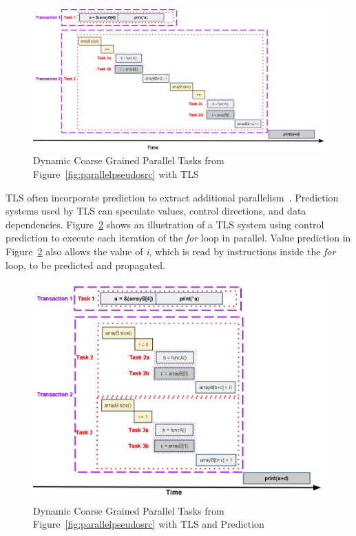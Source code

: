 \documentclass[defaultstyle,11pt]{thesis}
\begin{document}
\begin{figure}
\begin{center}
\includegraphics[width=5in]{images/ParallelTasksCoarseTLS}
\end{center}
\caption{Dynamic Coarse Grained Parallel Tasks from Figure~\ref{fig:parallelpseudosrc} with TLS}
\label{fig:parallelpseudocoarsetls}
\end{figure}

TLS often incorporate prediction to extract additional
parallelism~\cite{kejariwal:2007:tap}.  Prediction systems used by TLS
can speculate values, control directions, and data dependencies.
Figure~\ref{fig:parallelpseudocoarsepredtls} shows an illustration of
a TLS system using control prediction to execute each iteration of the
\textit{for} loop in parallel.  Value prediction in
Figure~\ref{fig:parallelpseudocoarsepredtls} also allows the value of
\textit{i}, which is read by instructions inside the \textit{for}
loop, to be predicted and propagated.

\begin{figure}
\begin{center}
\includegraphics[width=5in]{images/ParallelTasksCoarsePredTLS}
\end{center}
\caption{Dynamic Coarse Grained Parallel Tasks from Figure~\ref{fig:parallelpseudosrc} with TLS and Prediction}
\label{fig:parallelpseudocoarsepredtls}
\end{figure}
\end{document}
